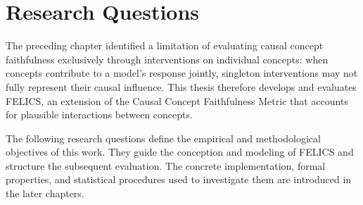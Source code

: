 \chapter{Research Questions}
\label{sec:research_questions}

The preceding chapter identified a limitation of evaluating causal concept
faithfulness exclusively through interventions on individual concepts: when
concepts contribute to a model's response jointly, singleton interventions may
not fully represent their causal influence. This thesis therefore develops and
evaluates FELICS, an extension of the Causal Concept Faithfulness Metric that
accounts for plausible interactions between concepts.

The following research questions define the empirical and methodological
objectives of this work. They guide the conception and modeling of FELICS and
structure the subsequent evaluation. The concrete implementation, formal
properties, and statistical procedures used to investigate them are introduced
in the later chapters.

